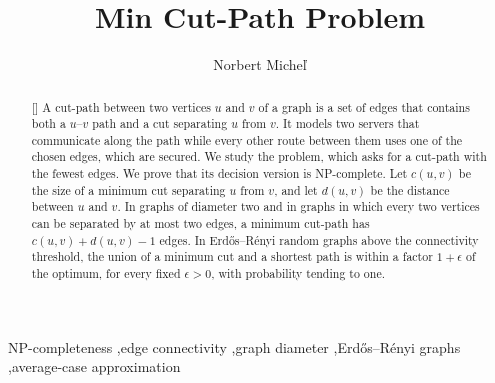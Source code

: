 

\title[mode = title]{Min Cut-Path Problem}

\author[1]{Norbert Micheľ}

\cormark[1]




\begin{abstract}[\abstractname]
A cut-path between two vertices $u$ and $v$ of a graph is a set of edges that contains both a $u$--$v$ path and a cut separating $u$ from $v$.
It models two servers that communicate along the path while every other route between them uses one of the chosen edges, which are secured.
We study the \MinCutPath{} problem, which asks for a cut-path with the fewest edges.
We prove that its decision version is NP-complete.
Let $c(u,v)$ be the size of a minimum cut separating $u$ from $v$, and let $d(u,v)$ be the distance between $u$ and $v$.
In graphs of diameter two and in graphs in which every two vertices can be separated by at most two edges, a minimum cut-path has $c(u,v) + d(u,v) - 1$ edges.
In Erdős–Rényi random graphs above the connectivity threshold, the union of a minimum cut and a shortest path is within a factor $1+\epsilon$ of the optimum, for every fixed $\epsilon > 0$, with probability tending to one.
\end{abstract}

\begin{keywords}
NP-completeness \sep edge connectivity \sep graph diameter \sep Erdős–Rényi graphs \sep average-case approximation
\end{keywords}

\maketitle


